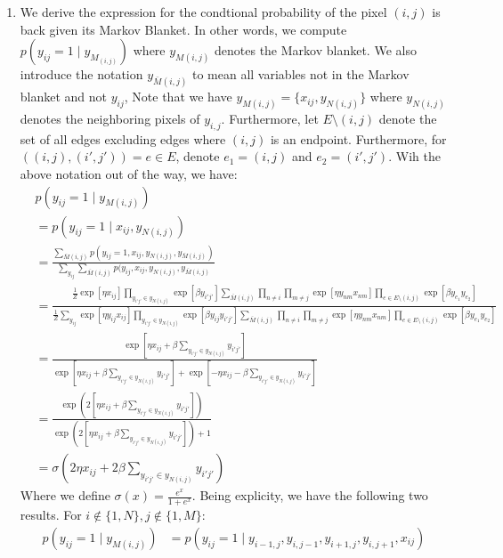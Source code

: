 \documentclass[12pt]{article}
\begin{document}
\begin{enumerate}[label=(\alph*)]
\item We derive the expression for the condtional probability of the pixel $(i,j)$ is back given its Markov Blanket. In other words, we compute $p(y_{ij} = 1 \mid y_{M_(i,j)})$ where $y_{M(i,j)}$ denotes the Markov blanket. We also introduce the notation $y_{\bar{M}(i,j)}$ to mean all variables not in the Markov blanket and not $y_{ij}$, Note that we have $y_{M(i,j)} = \{x_{ij}, y_{N(i,j)}\}$ where $y_{N(i,j)}$ denotes the neighboring pixels of $y_{i,j}$. Furthermore, let $E \setminus (i,j)$ denote the set of all edges excluding edges where $(i,j)$ is an endpoint. Furthermore, for $((i,j), (i',j')) = e \in E$, denote $e_1 = (i,j)$ and $e_2 = (i',j')$. Wih the above notation out of the way, we have:
\begin{align*}
&p(y_{ij} = 1 \mid y_{M(i,j)}) \\
&= p(y_{ij} = 1 \mid x_{ij}, y_{N(i,j)}) \\
&= \frac{\sum_{\bar{M}(i,j)} p(y_{ij} = 1, x_{ij}, y_{N(i,j)}, y_{\bar{M}(i,j)}) }{\sum_{y_{ij}}\sum_{\bar{M}(i,j)} p(y_{ij}, x_{ij}, y_{N(i,j)}, y_{\bar{M}(i,j)}} \\
&= \frac{\frac{1}{Z} \exp[\eta x_{ij}] \prod_{y_{i'j'} \in y_{N(i,j)}} \exp[\beta y_{i'j'}] \sum_{\bar{M}(i,j)}\prod_{n \neq i}\prod_{m \neq j}\exp[\eta y_{nm}x_{nm}] \prod_{e \in E \setminus (i,j)} \exp[\beta y_{e_1}y_{e_2}] }{\frac{1}{Z} \sum_{y_{ij}} \exp[\eta y_{ij}x_{ij}] \prod_{y_{i'j'} \in y_{N(i,j)}} \exp[\beta y_{ij}y_{i'j'}] \sum_{\bar{M}(i,j)}\prod_{n \neq i}\prod_{m \neq j}\exp[\eta y_{nm}x_{nm}] \prod_{e \in E \setminus (i,j)} \exp[\beta y_{e_1}y_{e_2}]} \\
&= \frac{\exp [\eta x_{ij} + \beta \sum_{y_{i'j'} \in y_{N(i,j)}} y_{i'j'}]}{\exp [\eta x_{ij} + \beta \sum_{y_{i'j'} \in y_{N(i,j)}} y_{i'j'}] + \exp [-\eta x_{ij} - \beta \sum_{y_{i'j'} \in y_{N(i,j)}} y_{i'j'}]} \\
&= \frac{\exp (2[\eta x_{ij} + \beta \sum_{y_{i'j'} \in y_{N(i,j)}} y_{i'j'}])}{\exp (2[\eta x_{ij} + \beta \sum_{y_{i'j'} \in y_{N(i,j)}} y_{i'j'}]) + 1} \\
&= \sigma(2\eta x_{ij} + 2\beta\sum_{y_{i'j'} \in y_{N(i,j)}} y_{i'j'})
\end{align*}
Where we define $\sigma(x) = \frac{e^x}{1 + e^x}$.
Being explicity, we have the following two results. For $i \not\in \{1,N\}, j \not\in \{1,M\}$:
\begin{align*}
	p(y_{ij} = 1 \mid y_{M(i,j)}) &= p(y_{ij} = 1 \mid y_{i-1, j}, y_{i, j-1}, y_{i+1, j}, y_{i, j + 1}, x_{ij}) \\

\end{align*}
\end{enumerate}
\end{document}
